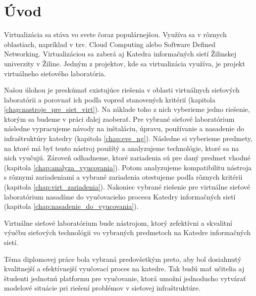 \chapter*{Úvod}

Virtualizácia sa stáva vo svete čoraz populárnejšou. Využíva sa v rôznych oblastiach, napríklad v tzv. Cloud Computing alebo Software Defined Networking. Virtualizáciou sa zaberá aj Katedra informačných sietí Žilinskej univerzity v Žiline. Jedným z projektov, kde sa virtualizácia využíva, je projekt virtuálneho sieťového laboratória. 

Našou úlohou je preskúmať existujúce riešenia v oblasti virtuálnych sieťových laboratórii a porovnať ich podľa vopred stanovených kritérií (kapitola \ref{chap:nastroje_pre_siet_virt}). Na základe toho z nich vyberieme jedno riešenie, ktorým sa budeme v práci ďalej zaoberať. Pre vybrané sieťové laboratórium následne vypracujeme návody na inštaláciu, úpravu, používanie a nasadenie do infraštruktúry katedry (kapitola \ref{chap:eve_ng}). Následne si vyberieme predmety, na ktoré má byť tento nástroj použítý a analyzujeme technológie, ktoré sa na nich vyučujú. Zároveň odhadneme, ktoré zariadenia sú pre daný predmet vhodné (kapitola \ref{chap:analyza_vyucovania}). Potom analyzujeme kompatibilitu nástroja s rôznymi zariadeniami a vybrané zariadenia otestujeme podľa rôznych kritérii (kapitola \ref{chap:virt_zariadenia}). Nakoniec vybrané riešenie pre virtuálne sieťové laboratórium nasadíme do vyučovacieho procesu Katedry informačných sietí (kapitola \ref{chap:nasadenie_do_vyucovania}).

Virtuálne sieťové laboratórium bude nástrojom, ktorý zefektívni a skvalitní výučbu sieťových technológii vo vybraných predmetoch na Katedre informačných sietí.

Téma diplomovej práce bola vybraná predovšetkým preto, aby bol dosiahnutý kvalitnejší a efektívnejší vyučovací proces na katedre. Tak budú mať učitelia aj študenti jednotnú platformu pre vyučovanie, ktorá umožní jednoducho vytvárať modelové situácie pri riešení problémov v sieťovej infraštruktúre.
